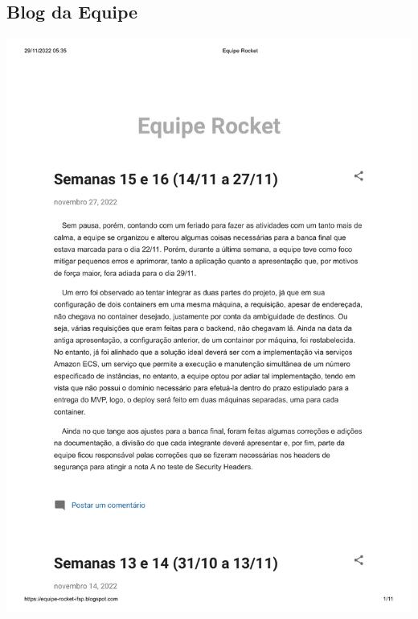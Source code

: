 \documentclass[
    12pt,               %
    openright,          %
    oneside,
    a4paper,            %
    BIBLATEX,           %
    TODO,               %
    english,            %
    brazil              %
    ]{ifsp-spo-inf-ctds}
\begin{document}
\begin{apendicesenv}
\begin {appendices}
\chapter{Blog da Equipe}
\includegraphics[page=1, width=1\linewidth,height=0.8\textheight]{Apêndices/EquipeRocketBlog.pdf}



\end{appendices}














\end{apendicesenv}
\end{document}
